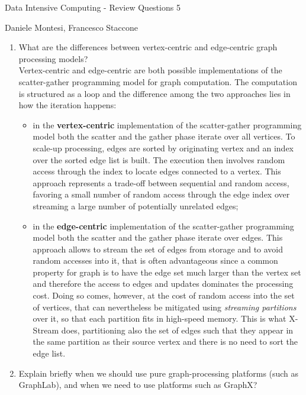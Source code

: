 \documentclass[]{report}
\begin{document}
\begin{center}
 {\Large Data Intensive Computing - Review Questions 5}
\end{center}
\begin{center}
 {\small Daniele Montesi, Francesco Staccone}
\end{center}
\vspace{1cm}
\justify
\begin{enumerate}
 \item What are the differences between vertex-centric and edge-centric graph processing models?\\
 
 Vertex-centric and edge-centric are both possible implementations of the scatter-gather programming model for graph computation. The computation is structured as a loop and the difference among the two approaches lies in how the iteration happens:
 \begin{itemize}
 \item in the \textbf{vertex-centric} implementation of the scatter-gather programming model both the scatter and the gather phase iterate over all vertices. To scale-up processing, edges are sorted by originating vertex and an index over the sorted edge list is built. The execution then involves random access through the index to locate edges connected to a vertex. This approach represents a trade-off between sequential and random access, favoring a small number of random access through the edge index over streaming a large number of potentially unrelated edges;
 \item in the \textbf{edge-centric} implementation of the scatter-gather programming model both the scatter and the gather phase iterate over edges. This approach allows to stream the set of edges from storage and to avoid random accesses into it,  that is often advantageous since a common property for graph is to have the edge set much larger than the vertex set and therefore the access to edges and updates dominates the processing cost. Doing
so comes, however, at the cost of random access into
the set of vertices, that can nevertheless be mitigated using \textit{streaming partitions} over it, so that each partition fits in high-speed memory. This is what X-Stream does, partitioning also the set of edges such that they appear in the same partition as their source vertex and there is no need to sort the edge list.
 \end{itemize}
 \item Explain briefly when we should use pure graph-processing platforms (such as GraphLab), and when we need to use platforms such as GraphX?\\
 

\end{enumerate}
\end{document}
